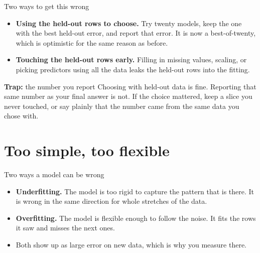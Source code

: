 \documentclass[aspectratio=169]{beamer}
\newenvironment{trap}[1]{\begin{alertblock}{\textbf{Trap:} #1}}{\end{alertblock}}
\begin{document}
\begin{frame}{Two ways to get this wrong}
\begin{itemize}
  \item \textbf{Using the held-out rows to choose.} Try twenty models, keep the one with the
        best held-out error, and report that error. It is now a best-of-twenty, which is
        optimistic for the same reason as before.
  \item \textbf{Touching the held-out rows early.} Filling in missing values, scaling, or
        picking predictors using all the data leaks the held-out rows into the fitting.
\end{itemize}
\begin{trap}{the number you report}
Choosing with held-out data is fine. Reporting that same number as your final answer is not.
If the choice mattered, keep a slice you never touched, or say plainly that the number came
from the same data you chose with.
\end{trap}
\end{frame}

\section{Too simple, too flexible}
\begin{frame}{Two ways a model can be wrong}
\begin{itemize}
  \item \textbf{Underfitting.} The model is too rigid to capture the pattern that is there.
        It is wrong in the same direction for whole stretches of the data.
  \item \textbf{Overfitting.} The model is flexible enough to follow the noise. It fits the
        rows it saw and misses the next ones.
  \item Both show up as large error on new data, which is why you measure there.
\end{itemize}
\end{frame}
\end{document}

